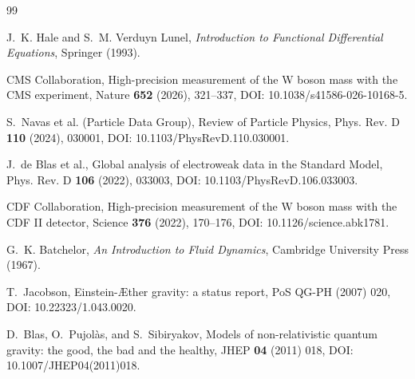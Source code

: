 \documentclass[11pt]{article}
\theoremstyle{definition}
\theoremstyle{plain}
\theoremstyle{remark}
\begin{document}
        \newpage
        
        
        \begin{thebibliography}{99}
            
            J.~K. Hale and S.~M. Verduyn Lunel,
            \newblock \emph{Introduction to Functional Differential Equations},
            \newblock Springer (1993).
            
            CMS Collaboration,
            \newblock High-precision measurement of the W boson mass with the CMS experiment,
            \newblock Nature \textbf{652} (2026), 321--337,
            \newblock DOI: 10.1038/s41586-026-10168-5.
            
            S.~Navas et al. (Particle Data Group),
            \newblock Review of Particle Physics,
            \newblock Phys. Rev. D \textbf{110} (2024), 030001,
            \newblock DOI: 10.1103/PhysRevD.110.030001.
            
            J.~de Blas et al.,
            \newblock Global analysis of electroweak data in the Standard Model,
            \newblock Phys. Rev. D \textbf{106} (2022), 033003,
            \newblock DOI: 10.1103/PhysRevD.106.033003.
            
            CDF Collaboration,
            \newblock High-precision measurement of the W boson mass with the CDF II detector,
            \newblock Science \textbf{376} (2022), 170--176,
            \newblock DOI: 10.1126/science.abk1781.
            
            G.~K. Batchelor,
            \newblock \emph{An Introduction to Fluid Dynamics},
            \newblock Cambridge University Press (1967).

            T.~Jacobson,
            \newblock Einstein-\AE ther gravity: a status report,
            \newblock PoS QG-PH (2007) 020,
            \newblock DOI: 10.22323/1.043.0020.

            D.~Blas, O.~Pujol\`as, and S.~Sibiryakov,
            \newblock Models of non-relativistic quantum gravity: the good, the bad and the healthy,
            \newblock JHEP \textbf{04} (2011) 018,
            \newblock DOI: 10.1007/JHEP04(2011)018.


\end{thebibliography}
\end{document}
